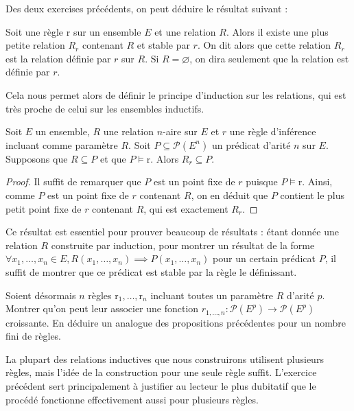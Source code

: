 Des deux exercises précédents, on peut déduire le résultat suivant :

\begin{corollary}
  Soit une règle $\mathrm r$ sur un ensemble $E$ et une relation $R$. Alors il
  existe une plus petite relation $R_r$ contenant $R$ et stable par $r$. On dit
  alors que cette relation $R_r$ est la relation définie par $r$ sur $R$. Si
  $R = \varnothing$, on dira seulement que la relation est définie par $r$.
\end{corollary}

Cela nous permet alors de définir le principe d'induction sur les relations,
qui est très proche de celui sur les ensembles inductifs.

\begin{theorem}
  Soit $E$ un ensemble, $R$ une relation $n$-aire sur $E$ et $r$ une règle
  d'inférence incluant comme paramètre $R$. Soit $P \subseteq \mathcal P(E^n)$
  un prédicat d'arité $n$ sur $E$. Supposons que $R\subseteq P$ et que
  $P\models \mathrm r$. Alors $R_r\subseteq P$.
\end{theorem}

\begin{proof}
  Il suffit de remarquer que $P$ est un point fixe de $r$ puisque
  $P\models \mathrm r$. Ainsi, comme $P$ est un point fixe de $r$ contenant
  $R$, on en déduit que $P$ contient le plus petit point fixe de $r$ contenant
  $R$, qui est exactement $R_r$.
\end{proof}

Ce résultat est essentiel pour prouver beaucoup de résultats : étant donnée une
relation $R$ construite par induction, pour montrer un résultat de la forme
$\forall x_1,\ldots,x_n\in E, R(x_1,\ldots,x_n)\implies P(x_1,\ldots,x_n)$ pour
un certain prédicat $P$, il suffit de montrer que ce prédicat est stable par
la règle le définissant.

\begin{exercise}
  Soient désormais $n$ règles $\mathrm r_1,\ldots,\mathrm r_n$ incluant toutes
  un paramètre $R$ d'arité $p$. Montrer qu'on peut leur associer une fonction
  $r_{1,\ldots,n} : \mathcal P(E^p) \to \mathcal P(E^p)$ croissante. En déduire
  un analogue des propositions précédentes pour un nombre fini de règles.
\end{exercise}

\begin{remark}
  La plupart des relations inductives que nous construirons utilisent plusieurs
  règles, mais l'idée de la construction pour une seule règle suffit. L'exercice
  précédent sert principalement à justifier au lecteur le plus dubitatif que
  le procédé fonctionne effectivement aussi pour plusieurs règles.
\end{remark}

